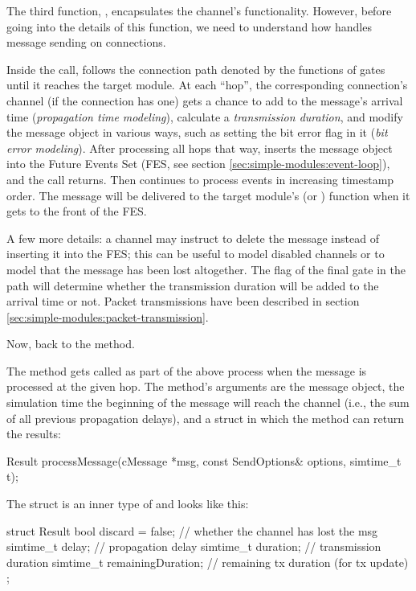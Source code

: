 The third function, , encapsulates the channel's
functionality. However, before going into the details of this function,
we need to understand how {\opp} handles message sending on connections.

Inside the  call, {\opp} follows the
connection path denoted by the  functions of gates
until it reaches the target module. At each ``hop'', the corresponding
connection's channel (if the connection has one) gets a chance to add to
the message's arrival time (\textit{propagation time modeling}), calculate a
\textit{transmission duration}, and modify the message object in various
ways, such as setting the bit error flag in it (\textit{bit error modeling}).
After processing all hops that way, {\opp} inserts the message object
into the Future Events Set (FES, see section
\ref{sec:simple-modules:event-loop}), and the  call returns.
Then {\opp} continues to process events in increasing timestamp order.
The message will be delivered to the target module's 
(or ) function when it gets to the front of the FES.

A few more details: a channel may instruct {\opp} to delete the message
instead of inserting it into the FES; this can be useful to model
disabled channels or to model that the message has been lost altogether.
The  flag of the final gate in the path
will determine whether the transmission duration will be added to the
arrival time or not. Packet transmissions have been described in section
\ref{sec:simple-modules:packet-transmission}.

Now, back to the  method.

The method gets called as part of the above process when the message
is processed at the given hop. The method's arguments are the message
object, the simulation time the beginning of the message will reach
the channel (i.e., the sum of all previous propagation delays),
and a struct in which the method can return the results:

\begin{cpp}
Result processMessage(cMessage *msg, const SendOptions& options, simtime_t t);
\end{cpp}

The  struct is an inner type of 
and looks like this:

\begin{cpp}
struct Result
{
    bool discard = false;        // whether the channel has lost the msg
    simtime_t delay;             // propagation delay
    simtime_t duration;          // transmission duration
    simtime_t remainingDuration; // remaining tx duration (for tx update)
};
\end{cpp}

